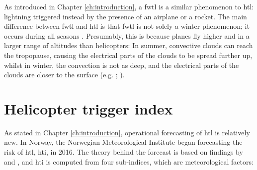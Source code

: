 As introduced in Chapter \ref{ch:introduction}, a \acrfull{fwtl} is a similar phenomenon to \acrshort{htl}: lightning triggered instead by the presence of an airplane or a rocket. The main difference between \acrshort{fwtl} and \acrshort{htl} is that \acrshort{fwtl} is not solely a winter phenomenon; it occurs during all seasons \cite{uman2003}. Presumably, this is because planes fly higher and in a larger range of altitudes than helicopters: In summer, convective clouds can reach the tropopause, causing the electrical parts of the clouds to be spread further up, whilst in winter, the convection is not as deep, and the electrical parts of the clouds are closer to the surface (e.g. \cite{uman2003}; \cite{michimoto2007}).

\section{Helicopter trigger index}\label{sec:hti}
As stated in Chapter \ref{ch:introduction}, operational forecasting of \acrshort{htl} is relatively new. In Norway, the Norwegian Meteorological Institute began forecasting the risk of \acrshort{htl}, \acrfull{hti}, in 2016. The theory behind the forecast is based on findings by \cite{hardwick1999} and \cite{wilkinson2013}, and \acrshort{hti} is computed from four sub-indices, which are meteorological factors:
